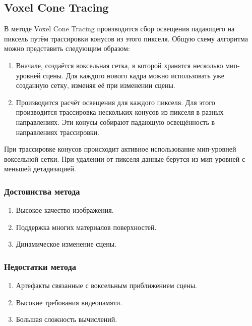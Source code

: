 \documentclass[12pt,fleqn]{article}
\begin{document}
\subsection{Voxel Cone Tracing}

В методе Voxel Cone Tracing производится сбор освещения падающего на пиксель путём трассировки конусов из этого пикселя. Общую схему алгоритма можно представить следующим образом:

\begin{enumerate}

\item Вначале, создаётся воксельная сетка, в которой хранятся несколько мип-уровней сцены. Для каждого нового кадра можно использовать уже созданную сетку, изменяя её при изменении сцены.

\item Производится расчёт освещения для каждого пикселя. Для этого производится трассировка нескольких конусов из пикселя в разных направлениях. Эти конусы собирают падающую освещённость в направлениях трассировки.

\end{enumerate}

При трассировке конусов происходит активное использование мип-уровней воксельной сетки. При удалении от пикселя данные берутся из мип-уровней с меньшей детадизацией.

\subsubsection{Достоинства метода}

\begin{enumerate}

\item Высокое качество изображения.

\item Поддержка многих материалов поверхностей.

\item Динамическое изменение сцены.

\end{enumerate}

\subsubsection{Недостатки метода}

\begin{enumerate}

\item Артефакты связанные с воксельным приближением сцены.

\item Высокие требования видеопамяти.

\item Большая сложность вычислений.

\end{enumerate}
\end{document}
